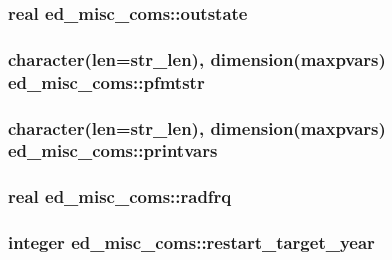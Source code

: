 \subsubsection[{outstate}]{\setlength{\rightskip}{0pt plus 5cm}real ed\+\_\+misc\+\_\+coms\+::outstate}\label{namespaceed__misc__coms_ae530849702ef966f40e0afc4f65b1375}
\hypertarget{namespaceed__misc__coms_aed54f9188bbb97c53b47547c92b42e8c}{}
\subsubsection[{pfmtstr}]{\setlength{\rightskip}{0pt plus 5cm}character(len=str\+\_\+len), dimension(maxpvars) ed\+\_\+misc\+\_\+coms\+::pfmtstr}\label{namespaceed__misc__coms_aed54f9188bbb97c53b47547c92b42e8c}
\hypertarget{namespaceed__misc__coms_abeda9131f5dae12b63b8d2521319f87d}{}
\subsubsection[{printvars}]{\setlength{\rightskip}{0pt plus 5cm}character(len=str\+\_\+len), dimension(maxpvars) ed\+\_\+misc\+\_\+coms\+::printvars}\label{namespaceed__misc__coms_abeda9131f5dae12b63b8d2521319f87d}
\hypertarget{namespaceed__misc__coms_aa6d6705e0925a134d7918ff8ac88f6f4}{}
\subsubsection[{radfrq}]{\setlength{\rightskip}{0pt plus 5cm}real ed\+\_\+misc\+\_\+coms\+::radfrq}\label{namespaceed__misc__coms_aa6d6705e0925a134d7918ff8ac88f6f4}
\hypertarget{namespaceed__misc__coms_ad370e6ac01b25fa7a3e25026a738f75a}{}
\subsubsection[{restart\+\_\+target\+\_\+year}]{\setlength{\rightskip}{0pt plus 5cm}integer ed\+\_\+misc\+\_\+coms\+::restart\+\_\+target\+\_\+year}\label{namespaceed__misc__coms_ad370e6ac01b25fa7a3e25026a738f75a}
\hypertarget{namespaceed__misc__coms_ac6069e59fcce057c13f934284b112682}{}
